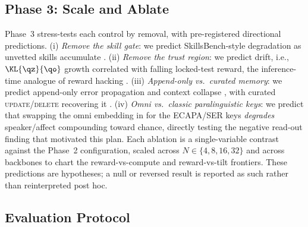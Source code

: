 \subsection{Phase 3: Scale and Ablate}
\label{sub:phase3}

Phase~3 stress-tests each control by removal, with pre-registered directional predictions. (i) \emph{Remove the skill gate}: we predict SkillsBench-style degradation as unvetted skills accumulate \citep{skillsbench2026,ace2025}. (ii) \emph{Remove the trust region}: we predict drift, i.e., $\KL{\qz}{\qo}$ growth correlated with falling locked-test reward, the inference-time analogue of reward hacking \citep{gao2023overopt,remembering2026}. (iii) \emph{Append-only vs.\ curated memory}: we predict append-only error propagation and context collapse \citep{expfollowing2025,ace2025}, with curated \textsc{update}/\textsc{delete} recovering it \citep{mem0_2025}. (iv) \emph{Omni vs.\ classic paralinguistic keys}: we predict that swapping the omni embedding in for the ECAPA/SER keys \emph{degrades} speaker/affect compounding toward chance, directly testing the negative read-out finding that motivated this plan. Each ablation is a single-variable contrast against the Phase~2 configuration, scaled across $N\in\{4,8,16,32\}$ and across backbones to chart the reward-vs-compute and reward-vs-tilt frontiers. These predictions are hypotheses; a null or reversed result is reported as such rather than reinterpreted post hoc.

\subsection{Evaluation Protocol}
\label{sub:protocol}

